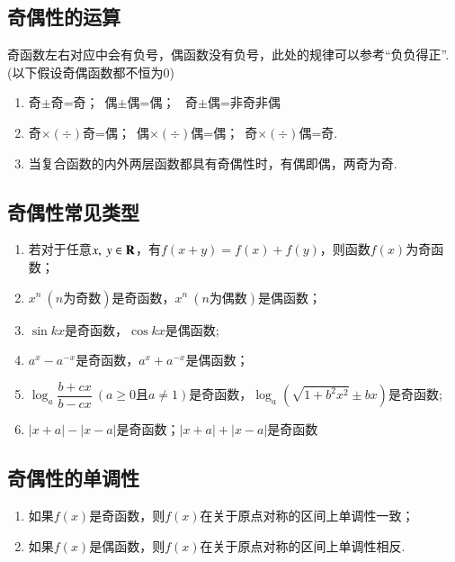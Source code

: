 \documentclass{BHCexam}
\begin{document}
\subsection{奇偶性的运算}
奇函数左右对应中会有负号，偶函数没有负号，此处的规律可以参考“负负得正”.{\kaishu (以下假设奇偶函数都不恒为$ 0 $)}
\begin{enumerate}[1)]
\item 奇$\pm$奇=奇；\  偶$\pm $偶=偶；
\  奇$\pm$偶=非奇非偶 
\item 奇$\times(\div)$奇=偶；\ 偶$\times(\div)$偶=偶；\  奇$\times(\div)$偶=奇.
\item 当复合函数的内外两层函数都具有奇偶性时，有偶即偶，两奇为奇.
\end{enumerate}
\subsection{奇偶性常见类型}
\begin{enumerate}[1)]
\item 若对于任意$ x,~y\in\mathbf{R} $，有$f(x+y)=f(x)+f(y)$，则函数$f(x)$为奇函数；
\item $x^n~(n\text{为奇数})$是奇函数，$x^n~(n\text{为偶数})$是偶函数；
\item $ \sin kx $是奇函数，$ \cos kx $是偶函数;
\item $ a^x-a^{-x} $是奇函数，$ a^x+a^{-x} $是偶函数；
\item $ \log_a\dfrac{b+cx}{b-cx} ~(a\ge 0\text{且}a\ne1)$是奇函数，$ \log_a\left(\sqrt{1+b^2x^2}\pm bx\right) $是奇函数;
\item $ \left|x+a\right|-\left|x-a\right| $是奇函数；$ \left|x+a\right|+\left|x-a\right| $是奇函数
\end{enumerate}
\subsection{奇偶性的单调性}
\begin{enumerate}[1)]
\item 如果$f(x)$是奇函数，则$f(x)$在关于原点对称的区间上单调性一致；
\item 如果$f(x)$是偶函数，则$f(x)$在关于原点对称的区间上单调性相反.
\end{enumerate}
\newpage
\end{document}
